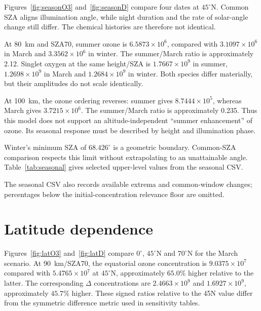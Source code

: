 Figures~\ref{fig:seasonO3} and~\ref{fig:seasonD} compare four dates at $45^\circ$N. Common SZA aligns illumination angle, while night duration and the rate of solar-angle change still differ. The chemical histories are therefore not identical.

At 80~km and SZA70, summer ozone is $6.5873\times10^6$, compared with $3.1097\times10^6$ in March and $3.3562\times10^6$ in winter. The summer/March ratio is approximately 2.12. Singlet oxygen at the same height/SZA is $1.7667\times10^9$ in summer, $1.2698\times10^9$ in March and $1.2684\times10^9$ in winter. Both species differ materially, but their amplitudes do not scale identically.

At 100~km, the ozone ordering reverses: summer gives $8.7444\times10^5$, whereas March gives $3.7215\times10^6$. The summer/March ratio is approximately 0.235. Thus this model does not support an altitude-independent ``summer enhancement'' of ozone. Its seasonal response must be described by height and illumination phase.


Winter's minimum SZA of $68.426^\circ$ is a geometric boundary. Common-SZA comparison respects this limit without extrapolating to an unattainable angle.
Table~\ref{tab:seasonal} gives selected upper-level values from the seasonal CSV.


The seasonal CSV also records available extrema and common-window changes; percentages below the initial-concentration relevance floor are omitted.
\clearpage

\section{Latitude dependence}
Figures~\ref{fig:latO3} and~\ref{fig:latD} compare $0^\circ$, $45^\circ$N and $70^\circ$N for the March scenario. At 90~km/SZA70, the equatorial ozone concentration is $9.0375\times10^7$ compared with $5.4765\times10^7$ at $45^\circ$N, approximately $65.0\%$ higher relative to the latter. The corresponding $\Delta$ concentrations are $2.4663\times10^9$ and $1.6927\times10^9$, approximately $45.7\%$ higher. These signed ratios relative to the 45N value differ from the symmetric difference metric used in sensitivity tables.

